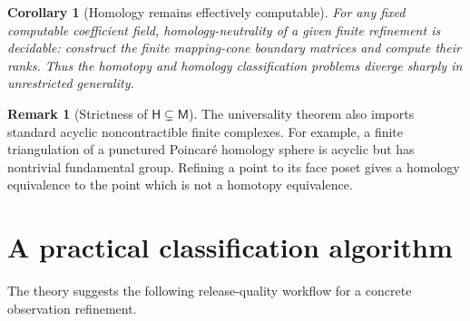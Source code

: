 \documentclass[11pt]{article}
\newtheorem{corollary}[theorem]{Corollary}
\theoremstyle{definition}
\newtheorem{remark}[theorem]{Remark}
\begin{document}
\begin{corollary}[Homology remains effectively computable]\label{cor:decidablehomology}
For any fixed computable coefficient field, homology-neutrality of a given finite refinement is decidable: construct the finite mapping-cone boundary matrices and compute their ranks. Thus the homotopy and homology classification problems diverge sharply in unrestricted generality.
\end{corollary}

\begin{remark}[Strictness of \(\mathsf H\subsetneq\mathsf M\)]
The universality theorem also imports standard acyclic noncontractible finite complexes. For example, a finite triangulation of a punctured Poincar\'e homology sphere is acyclic but has nontrivial fundamental group. Refining a point to its face poset gives a homology equivalence to the point which is not a homotopy equivalence.
\end{remark}

\section{A practical classification algorithm}

The theory suggests the following release-quality workflow for a concrete observation refinement.
\end{document}
